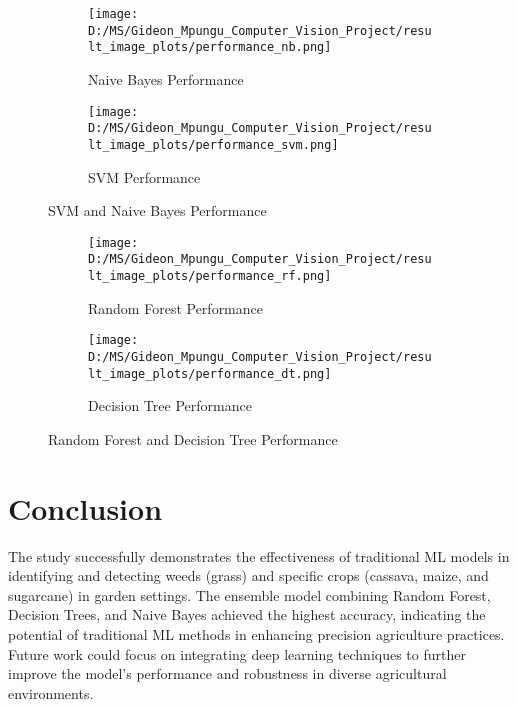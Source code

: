 \documentclass[10pt,twocolumn,letterpaper]{article}
\begin{document}
\begin{figure*}[ht]
    \centering
    
    \begin{subfigure}{0.45\textwidth}
        \texttt{[image: D:/MS/Gideon\_Mpungu\_Computer\_Vision\_Project/result\_image\_plots/performance\_nb.png]}
        \caption{Naive Bayes Performance}
        \label{fig:nb_perf}
    \end{subfigure}
    \hfill
    \begin{subfigure}{0.45\textwidth}
        \texttt{[image: D:/MS/Gideon\_Mpungu\_Computer\_Vision\_Project/result\_image\_plots/performance\_svm.png]}
        \caption{SVM Performance}
        \label{fig:svm_perf}
    \end{subfigure}
    
    \caption{SVM and Naive Bayes Performance}
    \label{fig:svm_and_nb_perf}
\end{figure*}

\begin{figure*}[ht]
    \centering
    
    \begin{subfigure}{0.45\textwidth}
        \texttt{[image: D:/MS/Gideon\_Mpungu\_Computer\_Vision\_Project/result\_image\_plots/performance\_rf.png]}
        \caption{Random Forest Performance}
        \label{fig:rf_perf}
    \end{subfigure}
    \hfill
    \begin{subfigure}{0.45\textwidth}
        \texttt{[image: D:/MS/Gideon\_Mpungu\_Computer\_Vision\_Project/result\_image\_plots/performance\_dt.png]}
        \caption{Decision Tree Performance}
        \label{fig:dt_perf}
    \end{subfigure}
    
    \caption{Random Forest and Decision Tree Performance}
    \label{fig:rf_and_dt_perf}
\end{figure*}


\section{Conclusion}
The study successfully demonstrates the effectiveness of traditional ML models in identifying and detecting weeds (grass) and specific crops (cassava, maize, and sugarcane) in garden settings. The ensemble model combining Random Forest, Decision Trees, and Naive Bayes achieved the highest accuracy, indicating the potential of traditional ML methods in enhancing precision agriculture practices. Future work could focus on integrating deep learning techniques to further improve the model's performance and robustness in diverse agricultural environments.
\end{document}
